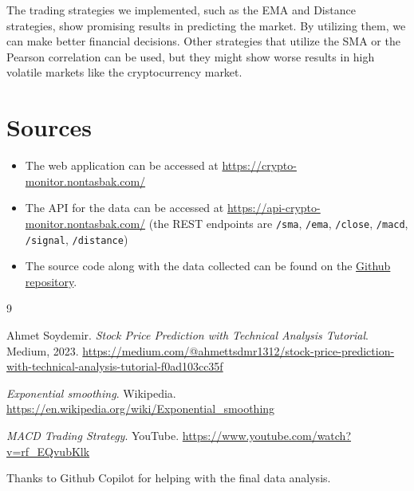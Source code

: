 \documentclass{article}
\begin{document}
The trading strategies we implemented, such as the EMA and Distance strategies, show promising results in predicting 
the market. By utilizing them, we can make better financial decisions. Other strategies that utilize the SMA or
the Pearson correlation can be used, but they might show worse results in high volatile markets like the cryptocurrency market.

\section{Sources}
\begin{itemize}
    \item The web application can be accessed at \url{https://crypto-monitor.nontasbak.com/}
    \item The API for the data can be accessed at \url{https://api-crypto-monitor.nontasbak.com/} (the REST endpoints are \texttt{/sma}, \texttt{/ema}, \texttt{/close}, \texttt{/macd}, \texttt{/signal}, \texttt{/distance})
    \item The source code along with the data collected can be found on the \href{https://github.com/NontasBak/embedded-crypto-monitor}{Github repository}.
\end{itemize}

\begin{thebibliography}{9}

Ahmet Soydemir.
\textit{Stock Price Prediction with Technical Analysis Tutorial}.
Medium, 2023.
\url{https://medium.com/@ahmettsdmr1312/stock-price-prediction-with-technical-analysis-tutorial-f0ad103cc35f}

\textit{Exponential smoothing}.
Wikipedia.
\url{https://en.wikipedia.org/wiki/Exponential_smoothing}

\textit{MACD Trading Strategy}.
YouTube.
\url{https://www.youtube.com/watch?v=rf_EQvubKlk}

Thanks to Github Copilot for helping with the final data analysis.

\end{thebibliography}
\end{document}
